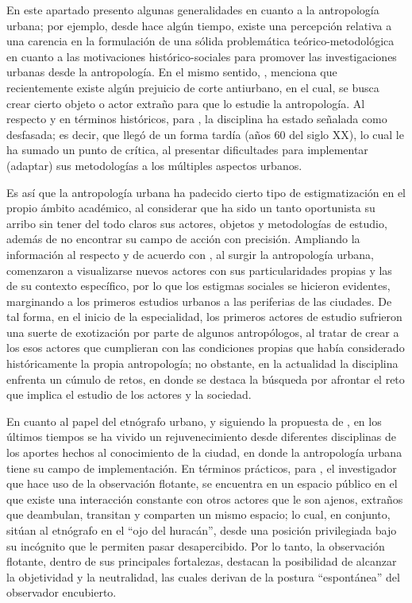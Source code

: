 \documentclass[
  spanish,
  11pt,
  a4paper,
]{scrbook}
\begin{document}
En este apartado presento algunas generalidades en cuanto a la
antropología urbana; por ejemplo, desde hace algún tiempo, existe una
percepción relativa a una carencia en la formulación de una sólida
problemática teórico-metodológica en cuanto a las motivaciones
histórico-sociales para promover las investigaciones urbanas desde la
antropología. En el mismo sentido, \textcite{Signorelli1999}, menciona
que recientemente existe algún prejuicio de corte antiurbano, en el
cual, se busca crear cierto objeto o actor extraño para que lo estudie
la antropología. Al respecto y en términos históricos, para
\textcite{Cuco2004}, la disciplina ha estado señalada como desfasada; es
decir, que llegó de un forma tardía (años 60 del siglo XX), lo cual le
ha sumado un punto de crítica, al presentar dificultades para
implementar (adaptar) sus metodologías a los múltiples aspectos urbanos.

Es así que la antropología urbana ha padecido cierto tipo de
estigmatización en el propio ámbito académico, al considerar que ha sido
un tanto oportunista su arribo sin tener del todo claros sus actores,
objetos y metodologías de estudio, además de no encontrar su campo de
acción con precisión. Ampliando la información al respecto y de acuerdo
con \textcite{Cuco2004}, al surgir la antropología urbana, comenzaron a
visualizarse nuevos actores con sus particularidades propias y las de su
contexto específico, por lo que los estigmas sociales se hicieron
evidentes, marginando a los primeros estudios urbanos a las periferias
de las ciudades. De tal forma, en el inicio de la especialidad, los
primeros actores de estudio sufrieron una suerte de exotización por
parte de algunos antropólogos, al tratar de crear a los esos actores que
cumplieran con las condiciones propias que había considerado
históricamente la propia antropología; no obstante, en la actualidad la
disciplina enfrenta un cúmulo de retos, en donde se destaca la búsqueda
por afrontar el reto que implica el estudio de los actores y la
sociedad.

En cuanto al papel del etnógrafo urbano, y siguiendo la propuesta de
\textcite{Hiernaux2007}, en los últimos tiempos se ha vivido un
rejuvenecimiento desde diferentes disciplinas de los aportes hechos al
conocimiento de la ciudad, en donde la antropología urbana tiene su
campo de implementación. En términos prácticos, para
\textcite{Delgado1999}, el investigador que hace uso de la observación
flotante, se encuentra en un espacio público en el que existe una
interacción constante con otros actores que le son ajenos, extraños que
deambulan, transitan y comparten un mismo espacio; lo cual, en conjunto,
sitúan al etnógrafo en el ``ojo del huracán'', desde una posición
privilegiada bajo su incógnito que le permiten pasar desapercibido. Por
lo tanto, la observación flotante, dentro de sus principales fortalezas,
destacan la posibilidad de alcanzar la objetividad y la neutralidad, las
cuales derivan de la postura ``espontánea'' del observador encubierto.
\end{document}
